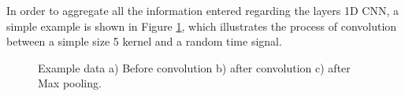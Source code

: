 In order to aggregate all the information entered regarding the layers {1D CNN}, a simple example is shown in Figure \ref{resdata}, which illustrates the process of convolution between a simple size 5 kernel and a random time signal.

\begin{figure}[h!]
\captionsetup[subfigure]{position=b}
\centering
{}
\caption{Example data a) Before convolution b) after convolution c) after Max pooling.}
\label{resdata}
\end{figure}



